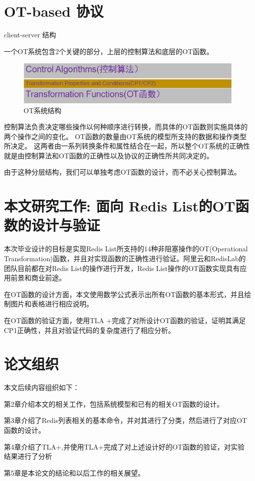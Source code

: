 \section{OT-based 协议}
client-server 结构

一个OT系统包含2个关键的部分，上层的控制算法和底层的OT函数。
\begin{figure}[H]
\centering
\includegraphics{figures/OT structure.jpg}
\caption{OT系统结构}
\end{figure}

控制算法负责决定哪些操作以何种顺序进行转换，而具体的OT函数则实施具体的两个操作之间的变化。
OT函数的数量由OT系统的模型所支持的数据和操作类型所决定。
这两者由一系列转换条件和属性结合在一起，所以整个OT系统的正确性就是由控制算法和OT函数的正确性以及协议的正确性所共同决定的。

由于这种分层结构，我们可以单独考虑OT函数的设计，而不必关心控制算法。
\cite{nichols1995high-latency}
\cite{sun2014exhaustive}

\section{本文研究工作: 面向 Redis List的OT函数的设计与验证}
	\par 本次毕业设计的目标是实现Redis List所支持的14种非阻塞操作的OT(Operational Transformation)函数，并且对实现函数的正确性进行验证。阿里云和RedisLab的团队目前都在对Redis List的操作进行开发，Redis List操作的OT函数实现具有应用前景和商业前途。

	\par 在OT函数的设计方面，本文使用数学公式表示出所有OT函数的基本形式，并且绘制图片和表格进行相应说明。

	\par 在OT函数的验证方面，使用TLA +完成了对所设计OT函数的验证，证明其满足CP1正确性，并且对验证代码的复杂度进行了相应分析。
\section{论文组织}
	\par 本文后续内容组织如下：
	\par 第2章介绍本文的相关工作，包括系统模型和已有的相关OT函数的设计。
	\par 第3章介绍了Redis列表相关的基本命令，并对其进行了分类，然后进行了对应OT函数的设计。
	\par 第4章介绍了TLA+,并使用TLA+完成了对上述设计好的OT函数的验证，对实验结果进行了分析
	\par 第5章是本论文的结论和以后工作的相关展望。
